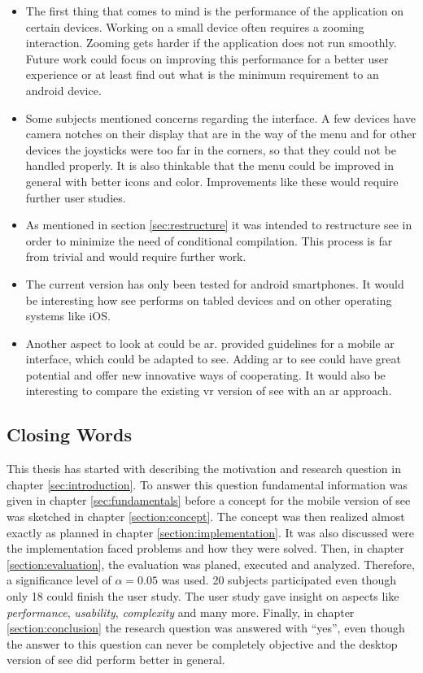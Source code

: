 \begin{itemize}
    \item The first thing that comes to mind is the performance of the application on certain devices. 
    Working on a small device often requires a zooming interaction.
    Zooming gets harder if the application does not run smoothly. 
    Future work could focus on improving this performance for a better user experience or at least find out what is the minimum requirement to an \gls{android} device.
    \item Some subjects mentioned concerns regarding the interface. 
    A few devices have camera notches on their display that are in the way of the menu and for other devices the joysticks were too far in the corners, so that they could not be handled properly.
    It is also thinkable that the menu could be improved in general with better icons and color.
    Improvements like these would require further user studies. 
    \item As mentioned in section \ref{sec:restructure} it was intended to restructure \gls{see} in order to minimize the need of conditional compilation.
    This process is far from trivial and would require further work. 
    \item The current version has only been tested for \gls{android} smartphones.
    It would be interesting how \gls{see} performs on tabled devices and on other operating systems like iOS.
    \item Another aspect to look at could be \gls{ar}. \cite{santos2016guidelines} provided guidelines for a mobile \gls{ar} interface, which could be adapted to \gls{see}. 
    Adding \gls{ar} to \gls{see} could have great potential and offer new innovative ways of cooperating. 
    It would also be interesting to compare the existing \gls{vr} version of \gls{see} with an \gls{ar} approach.
\end{itemize}

\subsection{Closing Words}

This thesis has started with describing the motivation and research question in chapter \ref{sec:introduction}.
To answer this question fundamental information was given in chapter \ref{sec:fundamentals} before a concept for the mobile version of \gls{see} was sketched in chapter \ref{section:concept}.
The concept was then realized almost exactly as planned in chapter \ref{section:implementation}.
It was also discussed were the implementation faced problems and how they were solved.
Then, in chapter \ref{section:evaluation}, the evaluation was planed, executed and analyzed. 
Therefore, a significance level of $\alpha = 0.05$ was used.
20 subjects participated even though only 18 could finish the user study. 
The user study gave insight on aspects like \textit{performance}, \textit{usability}, \textit{complexity} and many more.
Finally, in chapter \ref{section:conclusion} the research question was answered with \enquote{yes}, even though the answer to this question can never be completely objective and the desktop version of \gls{see} did perform better in general.